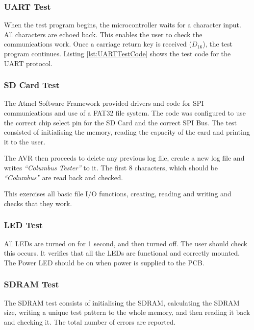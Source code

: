 \subsubsection{UART Test}\label{UART:Test}
When the test program begins, the microcontroller waits for a character input. All characters are echoed back. This enables the user to check the communications work. Once a carriage return key is received ($D_{16}$), the test program continues. Listing \ref{lst:UARTTestCode} shows the test code for the UART protocol.




\subsubsection{SD Card Test}\label{SD:Test}
The Atmel Software Framework \citep{Atmel:ASF} provided drivers and code for SPI communications and use of a FAT32 file system. The code was configured to use the correct chip select pin for the SD Card and the correct SPI Bus. The test consisted of initialising the memory, reading the capacity of the card and printing it to the user. 

The AVR then proceeds to delete any previous log file, create a new log file and writes \textit{``Columbus Tester''} to it. The first 8 characters, which should be \textit{``Columbus''} are read back and checked.


This exercises all basic file I/O functions, creating, reading and writing and checks that they work.

\subsubsection{LED Test}\label{LED:Test}
All LEDs are turned on for 1 second, and then turned off. The user should check this occurs. It verifies that all the LEDs are functional and correctly mounted. The Power LED should be on when power is supplied to the PCB. 

\subsubsection{SDRAM Test}\label{SDRAM:Test}
The SDRAM test consists of initialising the SDRAM, calculating the SDRAM size, writing a unique test pattern to the whole memory, and then reading it back and checking it. The total number of errors are reported. 

